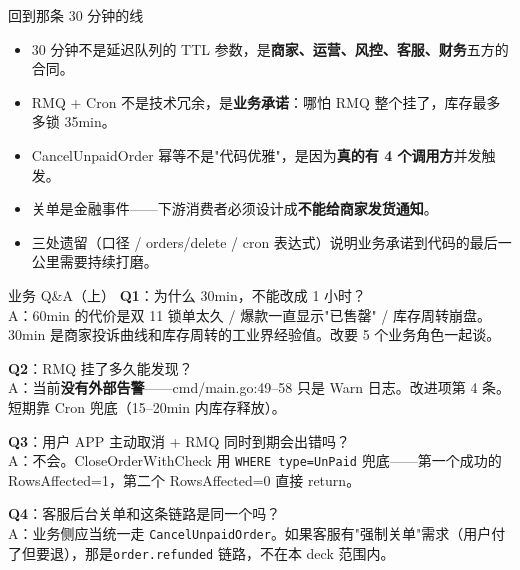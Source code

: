 \begin{frame}{回到那条 30 分钟的线}
\begin{itemize}
  \item 30 分钟不是延迟队列的 TTL 参数，是\textbf{商家、运营、风控、客服、财务}五方的合同。
  \item RMQ + Cron 不是技术冗余，是\textbf{业务承诺}：哪怕 RMQ 整个挂了，库存最多多锁 35min。
  \item CancelUnpaidOrder 幂等不是"代码优雅"，是因为\textbf{真的有 4 个调用方}并发触发。
  \item 关单是金融事件——下游消费者必须设计成\textbf{不能给商家发货通知}。
  \item 三处遗留（口径 / orders/delete / cron 表达式）说明业务承诺到代码的最后一公里需要持续打磨。
\end{itemize}
\end{frame}

\appendix

\begin{frame}{业务 Q\&A（上）}
\textbf{Q1}：为什么 30min，不能改成 1 小时？\\
\hspace{4mm}\small A：60min 的代价是双 11 锁单太久 / 爆款一直显示"已售罄" / 库存周转崩盘。30min 是商家投诉曲线和库存周转的工业界经验值。改要 5 个业务角色一起谈。

\vspace{2mm}
\textbf{Q2}：RMQ 挂了多久能发现？\\
\hspace{4mm}\small A：当前\textbf{没有外部告警}——cmd/main.go:49--58 只是 Warn 日志。改进项第 4 条。短期靠 Cron 兜底（15--20min 内库存释放）。

\vspace{2mm}
\textbf{Q3}：用户 APP 主动取消 + RMQ 同时到期会出错吗？\\
\hspace{4mm}\small A：不会。CloseOrderWithCheck 用 \texttt{WHERE type=UnPaid} 兜底——第一个成功的 RowsAffected=1，第二个 RowsAffected=0 直接 return。

\vspace{2mm}
\textbf{Q4}：客服后台关单和这条链路是同一个吗？\\
\hspace{4mm}\small A：业务侧应当统一走 \texttt{CancelUnpaidOrder}。如果客服有"强制关单"需求（用户付了但要退），那是\texttt{order.refunded} 链路，不在本 deck 范围内。
\end{frame}

